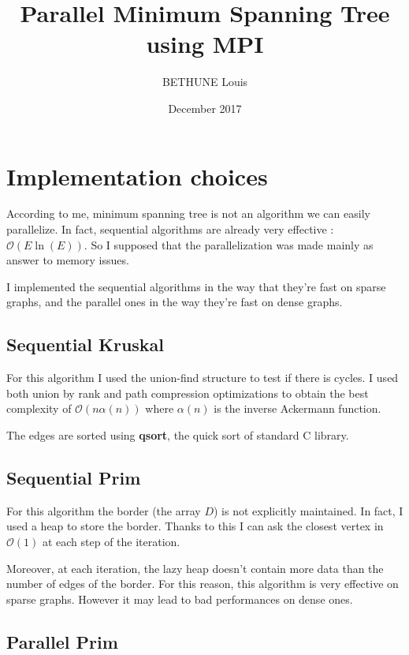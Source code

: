\documentclass[a4paper, 10pt]{article}
\begin{document}
\title{Parallel Minimum Spanning Tree using MPI}
\author{BETHUNE Louis}
\date{December 2017}

\maketitle

\section{Implementation choices}  
  
According to me, minimum spanning tree is not an algorithm we can easily parallelize. In fact, sequential algorithms are already very effective : $\mathcal{O}(E\ln(E))$. So I supposed that the parallelization was made mainly as answer to memory issues.  
  
I implemented the sequential algorithms in the way that they're fast on sparse graphs, and the parallel ones in the way they're fast on dense graphs.  

\subsection{Sequential Kruskal}

For this algorithm I used the union-find structure to test if there is cycles. I used both union by rank and path compression optimizations to obtain the best complexity of $\mathcal{O}(n\alpha(n))$ where $\alpha(n)$ is the inverse Ackermann function.  
  
The edges are sorted using \textbf{qsort}, the quick sort of standard C library.  
  
\subsection{Sequential Prim}

For this algorithm the border (the array $D$) is not explicitly maintained. In fact, I used a heap to store the border. Thanks to this I can ask the closest vertex in $\mathcal{O}(1)$ at each step of the iteration. 
  
Moreover, at each iteration, the lazy heap doesn't contain more data than the number of edges of the border. For this reason, this algorithm is very effective on sparse graphs. However it may lead to bad performances on dense ones.  

\subsection{Parallel Prim}
\end{document}

